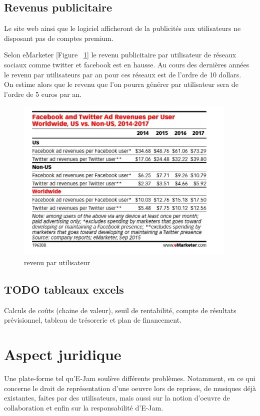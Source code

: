 \documentclass[a4,12pt]{article}
\begin{document}
\subsection{Revenus publicitaire}

Le site web ainsi que le logiciel afficheront de la publicités aux utilisateurs
ne disposant pas de comptes premium.

Selon eMarketer [Figure ~\ref{fig:revenu_par_utilisateur}] le revenu publicitaire par utilisateur de réseaux sociaux comme twitter et facebook est en hausse. Au cours des dernières années le revenu par utilisateurs par an pour ces réseaux est de l'ordre de 10 dollars.\\

On estime alors que le revenu que l'on pourra générer par utilisateur sera de l'ordre de 5 euros par an.

\begin{figure}[!h]
    \centering
    \includegraphics[width=300pt]{revenu_par_utilisateur.png}
    \caption{revenu par utilisateur}
    \label{fig:revenu_par_utilisateur}
\end{figure}

\subsection{TODO tableaux excels}

Calculs de coûts (chaine de valeur), seuil de rentabilité, compte de résultats prévisionnel, tableau de trésorerie et plan de financement.\\

\section{Aspect juridique}
Une plate-forme tel qu'E-Jam soulève différents problèmes. Notamment, en ce qui concerne le droit de représentation d'une oeuvre lors de reprises, de musiques déjà existantes, faites par des utilisateurs, mais aussi sur la notion d'oeuvre de collaboration et enfin sur la responsabilité d'E-Jam.
\end{document}
